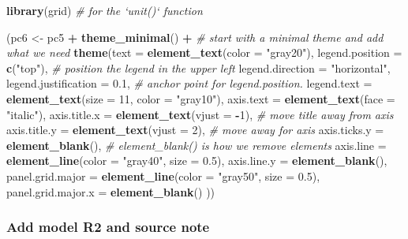 \documentclass[]{book}
\newenvironment{Shaded}{\begin{snugshade}}{\end{snugshade}}
\newcommand{\KeywordTok}[1]{\textcolor[rgb]{0.13,0.29,0.53}{\textbf{#1}}}
\newcommand{\DataTypeTok}[1]{\textcolor[rgb]{0.13,0.29,0.53}{#1}}
\newcommand{\DecValTok}[1]{\textcolor[rgb]{0.00,0.00,0.81}{#1}}
\newcommand{\FloatTok}[1]{\textcolor[rgb]{0.00,0.00,0.81}{#1}}
\newcommand{\StringTok}[1]{\textcolor[rgb]{0.31,0.60,0.02}{#1}}
\newcommand{\CommentTok}[1]{\textcolor[rgb]{0.56,0.35,0.01}{\textit{#1}}}
\newcommand{\OperatorTok}[1]{\textcolor[rgb]{0.81,0.36,0.00}{\textbf{#1}}}
\newcommand{\NormalTok}[1]{#1}
\begin{document}
\begin{Shaded}
\begin{Highlighting}[]
\KeywordTok{library}\NormalTok{(grid) }\CommentTok{# for the `unit()` function}

\NormalTok{(pc6 <-}\StringTok{ }\NormalTok{pc5 }\OperatorTok{+}
\StringTok{  }\KeywordTok{theme_minimal}\NormalTok{() }\OperatorTok{+}\StringTok{ }\CommentTok{# start with a minimal theme and add what we need}
\StringTok{  }\KeywordTok{theme}\NormalTok{(}\DataTypeTok{text =} \KeywordTok{element_text}\NormalTok{(}\DataTypeTok{color =} \StringTok{"gray20"}\NormalTok{),}
        \DataTypeTok{legend.position =} \KeywordTok{c}\NormalTok{(}\StringTok{"top"}\NormalTok{), }\CommentTok{# position the legend in the upper left }
        \DataTypeTok{legend.direction =} \StringTok{"horizontal"}\NormalTok{,}
        \DataTypeTok{legend.justification =} \FloatTok{0.1}\NormalTok{, }\CommentTok{# anchor point for legend.position.}
        \DataTypeTok{legend.text =} \KeywordTok{element_text}\NormalTok{(}\DataTypeTok{size =} \DecValTok{11}\NormalTok{, }\DataTypeTok{color =} \StringTok{"gray10"}\NormalTok{),}
        \DataTypeTok{axis.text =} \KeywordTok{element_text}\NormalTok{(}\DataTypeTok{face =} \StringTok{"italic"}\NormalTok{),}
        \DataTypeTok{axis.title.x =} \KeywordTok{element_text}\NormalTok{(}\DataTypeTok{vjust =} \OperatorTok{-}\DecValTok{1}\NormalTok{), }\CommentTok{# move title away from axis}
        \DataTypeTok{axis.title.y =} \KeywordTok{element_text}\NormalTok{(}\DataTypeTok{vjust =} \DecValTok{2}\NormalTok{), }\CommentTok{# move away for axis}
        \DataTypeTok{axis.ticks.y =} \KeywordTok{element_blank}\NormalTok{(), }\CommentTok{# element_blank() is how we remove elements}
        \DataTypeTok{axis.line =} \KeywordTok{element_line}\NormalTok{(}\DataTypeTok{color =} \StringTok{"gray40"}\NormalTok{, }\DataTypeTok{size =} \FloatTok{0.5}\NormalTok{),}
        \DataTypeTok{axis.line.y =} \KeywordTok{element_blank}\NormalTok{(),}
        \DataTypeTok{panel.grid.major =} \KeywordTok{element_line}\NormalTok{(}\DataTypeTok{color =} \StringTok{"gray50"}\NormalTok{, }\DataTypeTok{size =} \FloatTok{0.5}\NormalTok{),}
        \DataTypeTok{panel.grid.major.x =} \KeywordTok{element_blank}\NormalTok{()}
\NormalTok{        ))}
\end{Highlighting}
\end{Shaded}

\subsubsection{Add model R2 and source
note}\label{add-model-r2-and-source-note}
\end{document}

